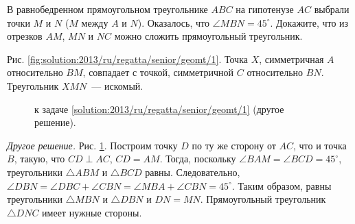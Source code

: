 \problem
В равнобедренном прямоугольном треугольнике $ABC$ на гипотенузе $AC$ выбрали
точки $M$ и $N$ ($M$ между $A$ и $N$).
Оказалось, что $\angle MBN = 45^\circ$.
Докажите, что из отрезков $AM$, $MN$ и $NC$ можно сложить прямоугольный
треугольник.

%
\label{solution:2013/ru/regatta/senior/geomt/1}%
Рис. \ref{fig:solution:2013/ru/regatta/senior/geomt/1}.
Точка $X$, симметричная $A$ относительно $BM$, совпадает с точкой, симметричной
$C$ относительно $BN$.
Треугольник $XMN$~--- искомый.
\par
\begin{figure}
\centering
\caption{к задаче \ref{solution:2013/ru/regatta/senior/geomt/1}
    (другое решение).}
\label{fig:solution:2013/ru/regatta/senior/geomt/1/another}
\end{figure}%
\emph{Другое решение.}
Рис. \ref{fig:solution:2013/ru/regatta/senior/geomt/1/another}.
Построим точку $D$ по ту же сторону от $AC$, что и точка $B$, такую, что
$CD \perp AC$, $CD = AM$.
Тогда, поскольку $\angle BAM = \angle BCD = 45^\circ$, треугольники
$\triangle ABM$ и $\triangle BCD$ равны.
Следовательно,
$\angle DBN = \angle DBC + \angle CBN = \angle MBA + \angle CBN = 45^\circ$.
Таким образом, равны треугольники $\triangle MBN$ и $\triangle DBN$ и
$DN = MN$.
Прямоугольный треугольник $\triangle DNC$ имеет нужные стороны.
\endproblem
